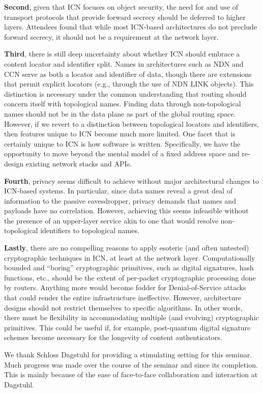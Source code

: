 \documentclass[a4paper,UKenglish]{dagrep}
\begin{document}
{\bf Second}, given that ICN focuses on object security, the need for and use of transport protocols that provide forward secrecy should be deferred to higher layers. Attendees found that while most ICN-based architectures do not preclude forward secrecy, it should not be a requirement at the network layer.

{\bf Third}, there is still deep uncertainty about whether ICN should embrace a content locator and identifier split. Names in architectures such as NDN and CCN serve as both a locator and identifier of data, though there are extensions that permit explicit locators (e.g., through the use of NDN LINK objects). This distinction is necessary under the common understanding that routing should concern itself with topological names. Finding data through non-topological names should not be in the data plane as part of the global routing space. However, if we revert to a distinction between topological locators and identifiers, then features unique to ICN become much more limited. One facet that is certainly unique to ICN is how software is written. Specifically, we have the opportunity to move beyond the mental model of a fixed address space and re-design existing network stacks and APIs.

{\bf Fourth}, privacy seems difficult to achieve without major architectural changes to ICN-based systems. In particular, since data names reveal a great deal of information to the passive eavesdropper, privacy demands that names and payloads have no correlation. However, achieving this seems infeasible without the presence of an upper-layer service akin to one that would resolve non-topological identifiers to topological names.

{\bf Lastly}, there are no compelling reasons to apply esoteric (and often untested) cryptographic techniques in ICN, at least at the network layer. Computationally bounded and ``boring'' cryptographic primitives, such as digital signatures, hash functions, etc., should be the extent of per-packet cryptographic processing done by routers. Anything more would become fodder for Denial-of-Service attacks that could render the entire infrastructure ineffective. However, architecture designs should not restrict themselves to specific algorithms. In other words, there must be flexibility in accommodating multiple (and evolving) cryptographic primitives. This could be useful if, for example, post-quantum digital signature schemes become necessary for the longevity of content authenticators.

We thank Schloss Dagstuhl for providing a stimulating setting for this seminar. Much progress was made over the course of the seminar and since its completion. This is mainly because of the ease of face-to-face collaboration and interaction at Dagstuhl.
\end{document}
